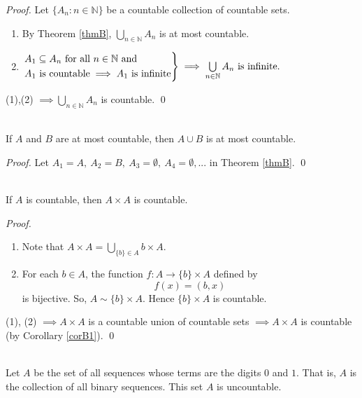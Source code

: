 \begin{proof}
    Let $\{A_n : n \in \mathbb{N}\}$ be a countable collection of countable sets.
    \begin{enumerate}
        \item By Theorem \ref{thmB}, $\bigcup \limits_{n\in \mathbb{N}} A_n$ is at most countable.
        \item $\begin{rcases*}
            A_1 \subseteq A_n \text{ for all } n \in \mathbb{N} \text{ and } \\
            A_1 \text{ is countable} \implies A_1 \text{ is infinite} \end{rcases*}
            \implies \bigcup \limits_{n\in \mathbb{N}}A_n \text{ is infinite.}$
    \end{enumerate}
	(1),(2) $\implies \bigcup \limits_{n\in \mathbb{N}} A_n$ is countable. \qed
\end{proof}

\begin{corollary} \leavevmode \\
    \label{corB2}
    If $A$ and $B$ are at most countable, then $A\cup B$ is at most countable.
\end{corollary}

\begin{proof}
    Let $A_1=A, ~A_2=B, ~A_3= \emptyset, ~A_4 = \emptyset, ...$ in Theorem \ref{thmB}. \qed
\end{proof}

\begin{theorem} \leavevmode \\
    If $A$ is countable, then $A \times A$ is countable.
\end{theorem}

\begin{proof}
    \begin{enumerate}[$(1)$]
        \item Note that $A \times A = \bigcup \limits_{\{b\} \in A} {b} \times A$.
        \item For each $b \in A$, the function $f:A \rightarrow {\{b\}} \times A$ defined by $$ f(x) = (b, x)$$ is bijective. So, $A \sim \{b\} \times A.$ Hence $\{b\} \times A$ is countable.
    \end{enumerate}
	(1), (2) $\implies A \times A$ is a countable union of countable sets $\implies A \times A$ is countable (by Corollary \ref{corB1}).
    \qed
\end{proof}

\begin{theorem} \leavevmode \\
    \label{thmD}
    Let $A$ be the set of all sequences whose terms are the digits $0$ and $1$. That is, $A$ is the collection of all binary sequences. This set $A$ is uncountable.
\end{theorem}

